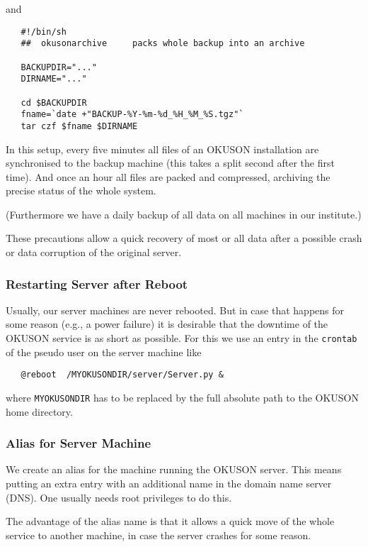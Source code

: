 \documentclass[12pt,openany,a4paper]{book}
\newcommand{\OKUSON}{\textsf{OKUSON}}
\begin{document}
and

\begin{verbatim}
   #!/bin/sh
   ##  okusonarchive     packs whole backup into an archive

   BACKUPDIR="..."
   DIRNAME="..."

   cd $BACKUPDIR
   fname=`date +"BACKUP-%Y-%m-%d_%H_%M_%S.tgz"`
   tar czf $fname $DIRNAME
\end{verbatim}

In this setup, every five minutes all files of an {\OKUSON} installation 
are synchronised to the backup machine (this takes a split second after the 
first time). And once an hour all files are packed and compressed, archiving 
the precise status of the whole system.

(Furthermore we have a daily backup of all data on all machines in our 
institute.)

These precautions allow a quick recovery of most or all data after a
possible crash or data corruption of the original server.

\subsubsection*{Restarting Server after Reboot}

Usually, our server machines are never rebooted. But in case that happens
for some reason (e.g., a power failure) it is desirable that the downtime of
the {\OKUSON} service is as short as possible. For this we use an entry
in the \texttt{crontab} of the pseudo user on the server machine like

\begin{verbatim}
   @reboot  /MYOKUSONDIR/server/Server.py &
\end{verbatim}

where \texttt{MYOKUSONDIR} has to be replaced by the full absolute path to the
{\OKUSON} home directory.

\subsubsection*{Alias for Server Machine}

We create an alias for the machine running the {\OKUSON} server. This means
putting an extra entry with an additional name in the domain name server (DNS).
One usually needs root privileges to do this.

The advantage of the alias name is that it allows a quick move of the
whole service to another machine, in case the server crashes for some
reason.
\end{document}
